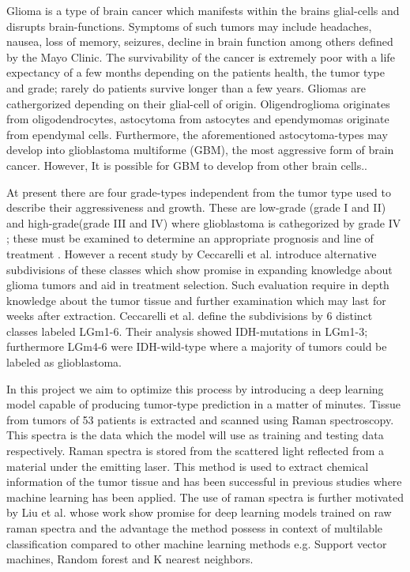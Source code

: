 Glioma is a type of brain cancer which manifests within the brains glial-cells and disrupts brain-functions. Symptoms of such tumors may include headaches, nausea, loss of memory, seizures, decline in brain function among others defined by the Mayo Clinic\cite{mayoglioma}. The survivability of the cancer is extremely poor with a life expectancy of a few months depending on the patients health, the tumor type and grade; rarely do patients survive longer than a few years\cite{gallego2015nonsurgical}\cite{bleeker2012recent}. Gliomas are cathergorized depending on their glial-cell of origin. Oligendroglioma originates from oligodendrocytes, astocytoma from astocytes and ependymomas originate from ependymal cells\cite{nihglioma}. Furthermore, the aforementioned astocytoma-types may develop into glioblastoma multiforme (GBM), the most aggressive form of brain cancer. However, It is possible for GBM to develop from other brain cells.\cite{gallego2015nonsurgical}.

At present there are four grade-types independent from the tumor type used to describe their aggressiveness and growth. These are low-grade (grade I and II) and high-grade(grade III and IV) where glioblastoma is cathegorized by grade IV \cite{bleeker2012recent}; these must be examined to determine an appropriate prognosis and line of treatment \cite{hopkinsglioma}. However a recent study by Ceccarelli et al.\cite{cellsubsets} introduce alternative subdivisions of these classes which show promise in expanding knowledge about glioma tumors and aid in treatment selection. Such evaluation require in depth knowledge about the tumor tissue and  further examination which may last for weeks after extraction. Ceccarelli et al. define the subdivisions by 6 distinct classes labeled LGm1-6. Their analysis showed IDH-mutations in LGm1-3; furthermore LGm4-6 were IDH-wild-type where a majority of tumors could be labeled as glioblastoma.

In this project we aim to optimize this process by introducing a deep learning model capable of producing tumor-type prediction in a matter of minutes. Tissue from tumors of 53 patients is extracted and scanned using Raman spectroscopy. This spectra is the data which the model will use as training and testing data respectively. Raman spectra is stored from the scattered light reflected from a material under the emitting laser. This method is used to extract chemical information of the tumor tissue and has been successful in previous studies where machine learning has been applied\cite{ramanDL}\cite{ho2019rapid}. The use of raman spectra is further motivated by Liu et al.\cite{liu2017deep} whose work show promise for deep learning models trained on raw raman spectra and the advantage the method possess in context of multilable classification compared to other machine learning methods e.g. Support vector machines, Random forest and K nearest neighbors.